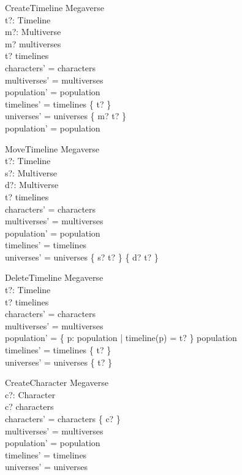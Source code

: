 \documentclass{article}
\begin{document}
\begin{schema}{CreateTimeline}
\Delta Megaverse \\
t?: Timeline \\
m?: Multiverse \\
\where
m? \in multiverses \\ 
t? \notin timelines \\ 
characters' = characters \\ 
multiverses' = multiverses \\
population' = population \\ 
timelines' = timelines \cup \{ t? \} \\
universes' = universes \cup \{ m? \mapsto t? \} \\
population' = population \\
\end{schema}

\begin{schema}{MoveTimeline}
\Delta Megaverse \\
t?: Timeline \\
s?: Multiverse \\
d?: Multiverse \\
\where
t? \in timelines \\
characters' = characters \\ 
multiverses' = multiverses \\
population' = population \\
timelines' = timelines \\ 
universes' = universes \setminus \{ s? \mapsto t? \} \cup \{ d? \mapsto t? \} \\
\end{schema}

\begin{schema}{DeleteTimeline}
\Delta Megaverse \\
t?: Timeline \\
\where
t? \in timelines \\
characters' = characters \\ 
multiverses' = multiverses \\
population' = \{ p: \dom population | timeline(p) = t? \} \dres population \\
timelines' = timelines \setminus \{ t? \} \\
universes' = universes \nrres \{ t? \} \\
\end{schema}

\begin{schema}{CreateCharacter}
\Delta Megaverse \\
c?: Character \\
\where 
c? \notin characters \\
characters' = characters \cup \{ c? \} \\
multiverses' = multiverses \\
population' = population \\
timelines' = timelines \\
universes' = universes \\
\end{schema}
\end{document}
